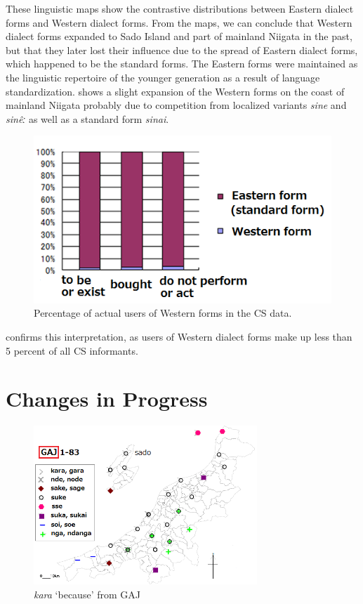 \documentclass[output=paper]{LSP/langsci}
\begin{document}
These linguistic maps show the contrastive distributions between Eastern dialect forms and Western dialect forms.  From the maps, we can conclude that Western dialect forms expanded to Sado Island and part of mainland Niigata in the past, but that they later lost their influence due to the spread of Eastern dialect forms, which happened to be the standard forms. The Eastern forms were maintained as the linguistic repertoire of the younger generation as a result of language standardization.  shows a slight expansion of the Western forms on the coast of mainland Niigata probably due to  competition from localized variants \textit{sine} and \textit{sin\^{e}ː} as well as a standard form \textit{sinai}.  

\begin{figure}
\includegraphics[width=.75\textwidth]{illustrations/fuku2_fig3}
\caption{Percentage of actual users of Western forms in the \textsc{CS} data.}
\label{fig:3}
\end{figure}

 confirms this interpretation, as users of Western dialect forms make up less than 5 percent of all \textsc{CS} informants.

\section{Changes in Progress}

\begin{figure}
\includegraphics[width=0.75\textwidth]{illustrations/fuku2_fig4a}
\caption{\textit{kara} `because' from GAJ}
\label{fig:4a}
\end{figure}
\end{document}

